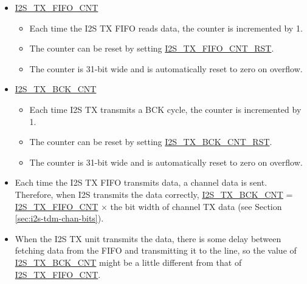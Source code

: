 \documentclass[main\_\_EN.tex]{subfiles}
\begin{document}
\begin{itemize}
    \item \hyperref[fielddesc:I2STXFIFOCNT]{I2S\_TX\_FIFO\_CNT}
    \begin{itemize}
        \item Each time the I2S TX FIFO reads data, the counter is incremented by 1.
        \item The counter can be reset by setting \hyperref[fielddesc:I2STXFIFOCNTRST]{I2S\_TX\_FIFO\_CNT\_RST}.
        \item The counter is 31-bit wide and is automatically reset to zero on overflow.
    \end{itemize}
    \item \hyperref[fielddesc:I2STXBCKCNT]{I2S\_TX\_BCK\_CNT}
    \begin{itemize}
        \item Each time I2S TX transmits a BCK cycle, the counter is incremented by 1.
        \item The counter can be reset by setting \hyperref[fielddesc:I2STXBCKCNTRST]{I2S\_TX\_BCK\_CNT\_RST}.
        \item The counter is 31-bit wide and is automatically reset to zero on overflow.
    \end{itemize}
\end{itemize}

\vspace{-0.5em}
\begin{tiplisting}
\vspace{-2em}
\begin{itemize}
    \item Each time the I2S TX FIFO transmits data, a channel data is sent. Therefore, when I2S transmits the data correctly, \hyperref[fielddesc:I2STXBCKCNT]{I2S\_TX\_BCK\_CNT} = \hyperref[fielddesc:I2STXFIFOCNT]{I2S\_TX\_FIFO\_CNT} × the bit width of channel TX data (see Section \ref{sec:i2s-tdm-chan-bits}).
    \item When the I2S TX unit transmits the data, there is some delay between fetching data from the FIFO and transmitting it to the line, so the value of \hyperref[fielddesc:I2STXBCKCNT]{I2S\_TX\_BCK\_CNT} might be a little different from that of \hyperref[fielddesc:I2STXFIFOCNT]{I2S\_TX\_FIFO\_CNT}.
\end{itemize}
\end{tiplisting}
\vspace{-1em}
\end{document}
